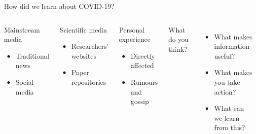 
\begin{frame}{How did we learn about COVID-19?}

\begin{columns}[t]
    \begin{block}{Mainstream media}
        \begin{itemize}
            \item Traditional news
            \item Social media
        \end{itemize}
    \end{block}
    
    \begin{block}{Scientific media}
        \begin{itemize}
            \item Researchers' websites
            \item Paper repositories
        \end{itemize}
    \end{block}
    
     \begin{block}{Personal experience}
        \begin{itemize}
            \item Directly affected
            \item Rumours and gossip
        \end{itemize}
    \end{block}
    

    What do you think?

    \begin{itemize}
        \item What makes information useful?
        \item What makes you take action?
        \item What can we learn from this?
    \end{itemize}
        
\end{columns}    

\end{frame}


